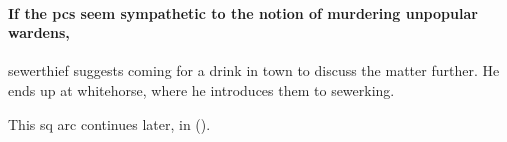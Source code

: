 \paragraph{If the \glspl{pc} seem sympathetic to the notion of murdering unpopular \glspl{warden},}
\gls{sewerthief} suggests coming for a drink in \gls{town} to discuss the matter further.
He ends up at \gls{whitehorse}, where he introduces them to \gls{sewerking}.

\bigLine

This \gls{sq} arc continues later, in  ().

